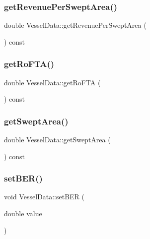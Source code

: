 \mbox{\label{class_vessel_data_a2f2d6847fe7e22eb832781d293d22298}} 
\subsubsection{\texorpdfstring{getRevenuePerSweptArea()}{getRevenuePerSweptArea()}}
{\footnotesize\ttfamily double Vessel\+Data\+::get\+Revenue\+Per\+Swept\+Area (\begin{DoxyParamCaption}{ }\end{DoxyParamCaption}) const}

\mbox{\label{class_vessel_data_aeaf3e35cd70fc77e3a486a10d20e0279}} 
\subsubsection{\texorpdfstring{getRoFTA()}{getRoFTA()}}
{\footnotesize\ttfamily double Vessel\+Data\+::get\+Ro\+F\+TA (\begin{DoxyParamCaption}{ }\end{DoxyParamCaption}) const}

\mbox{\label{class_vessel_data_a15988c733658a2aeb3ec67222aa15519}} 
\subsubsection{\texorpdfstring{getSweptArea()}{getSweptArea()}}
{\footnotesize\ttfamily double Vessel\+Data\+::get\+Swept\+Area (\begin{DoxyParamCaption}{ }\end{DoxyParamCaption}) const}

\mbox{\label{class_vessel_data_a4ed7b67084683a6be22a31a803713ff9}} 
\subsubsection{\texorpdfstring{setBER()}{setBER()}}
{\footnotesize\ttfamily void Vessel\+Data\+::set\+B\+ER (\begin{DoxyParamCaption}\item[{double}]{value }\end{DoxyParamCaption})}

